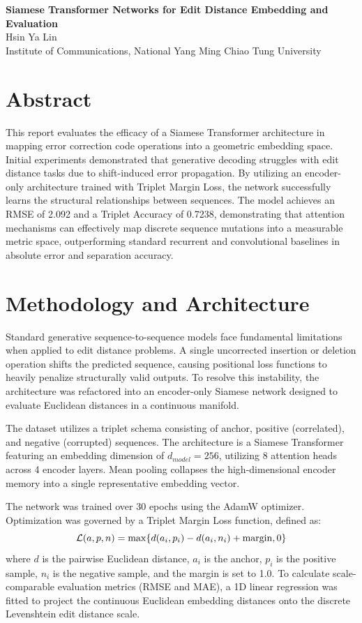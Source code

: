 \documentclass[12pt, letterpaper]{article}
\begin{document}
\begin{center}
    \textbf{Siamese Transformer Networks for Edit Distance Embedding and Evaluation} \\
    Hsin Ya Lin \\
    Institute of Communications, National Yang Ming Chiao Tung University
\end{center}

\section*{Abstract}
This report evaluates the efficacy of a Siamese Transformer architecture in mapping error correction code operations into a geometric embedding space. Initial experiments demonstrated that generative decoding struggles with edit distance tasks due to shift-induced error propagation. By utilizing an encoder-only architecture trained with Triplet Margin Loss, the network successfully learns the structural relationships between sequences. The model achieves an RMSE of 2.092 and a Triplet Accuracy of 0.7238, demonstrating that attention mechanisms can effectively map discrete sequence mutations into a measurable metric space, outperforming standard recurrent and convolutional baselines in absolute error and separation accuracy.

\section*{Methodology and Architecture}
Standard generative sequence-to-sequence models face fundamental limitations when applied to edit distance problems. A single uncorrected insertion or deletion operation shifts the predicted sequence, causing positional loss functions to heavily penalize structurally valid outputs. To resolve this instability, the architecture was refactored into an encoder-only Siamese network designed to evaluate Euclidean distances in a continuous manifold.

The dataset utilizes a triplet schema consisting of anchor, positive (correlated), and negative (corrupted) sequences. The architecture is a Siamese Transformer featuring an embedding dimension of $d_{model} = 256$, utilizing 8 attention heads across 4 encoder layers. Mean pooling collapses the high-dimensional encoder memory into a single representative embedding vector. 

The network was trained over 30 epochs using the AdamW optimizer. Optimization was governed by a Triplet Margin Loss function, defined as:
\begin{equation}
    \mathcal{L}(a, p, n) = \max \{ d(a_i, p_i) - d(a_i, n_i) + {\rm margin}, 0 \}
\end{equation}
where $d$ is the pairwise Euclidean distance, $a_i$ is the anchor, $p_i$ is the positive sample, $n_i$ is the negative sample, and the margin is set to 1.0. To calculate scale-comparable evaluation metrics (RMSE and MAE), a 1D linear regression was fitted to project the continuous Euclidean embedding distances onto the discrete Levenshtein edit distance scale.
\end{document}
